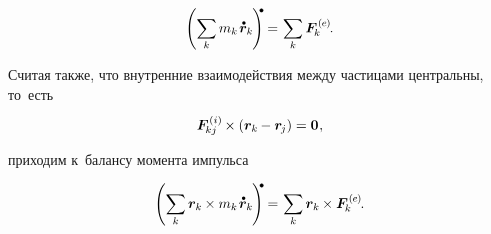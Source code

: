 \nopagebreak\vspace{-0.1em}\begin{equation}\label{balanceoftranslationalmomentum.discrete}
\left( \displaystyle \sum_{\smash{k}} m_k \hspace{.2ex} \mathdotabove{\bm{r}}_k \hspace{-0.16ex} \right)^{\hspace{-0.28em}\tikz[baseline=-0.2ex]\draw[black, fill=black] (0,0) circle (.28ex);} \hspace{-0.12ex}
= \hspace{.16ex}
\displaystyle \sum_{\smash{k}} \bm{F}^{\expexternal}_{\hspace{-0.16ex}k} \hspace{-0.12ex}.
\end{equation}

\foreignlanguage{russian}{Считая также, что внутренние взаимодействия между частицами центральны, то~есть}

\nopagebreak\vspace{-0.1em}\begin{equation*}
\bm{F}^{\expinternal}_{\hspace{-0.16ex}kj} \times \left( \bm{r}_k \hspace{-0.12ex} - \bm{r}_{\hspace{-0.16ex}j} \right) = \bm{0} \hspace{.1ex},
\end{equation*}

\vspace{-0.2em} \noindent \foreignlanguage{russian}{приходим к~балансу момента импульса}

\nopagebreak\vspace{-0.2em}\begin{equation}\label{balanceofrotationalmomentum.discrete}
\left( \displaystyle \sum_{\smash{k}} \bm{r}_k \hspace{-0.12ex} \times m_k \hspace{.2ex} \mathdotabove{\bm{r}}_k \hspace{-0.16ex} \right)^{\hspace{-0.25em}\tikz[baseline=-0.2ex]\draw[black, fill=black] (0,0) circle (.28ex);} \hspace{-0.12ex}
= \hspace{.16ex}
\displaystyle \sum_{\smash{k}} \bm{r}_k \hspace{-0.12ex} \times \bm{F}^{\expexternal}_{\hspace{-0.16ex}k} \hspace{-0.12ex}.
\end{equation}

